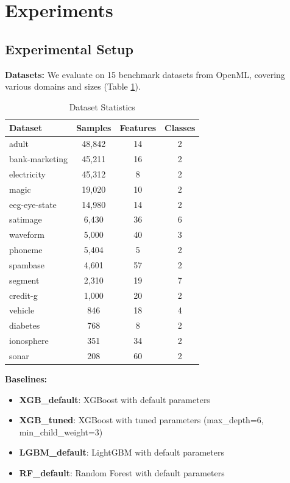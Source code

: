 \documentclass[conference]{IEEEtran}
\begin{document}
\section{Experiments}

\subsection{Experimental Setup}

\textbf{Datasets:} We evaluate on 15 benchmark datasets from OpenML, covering various domains and sizes (Table \ref{tab:datasets}).

\begin{table}[htbp]
\caption{Dataset Statistics}
\label{tab:datasets}
\centering
\begin{tabular}{lccc}
\toprule
Dataset & Samples & Features & Classes \\
\midrule
adult & 48,842 & 14 & 2 \\
bank-marketing & 45,211 & 16 & 2 \\
electricity & 45,312 & 8 & 2 \\
magic & 19,020 & 10 & 2 \\
eeg-eye-state & 14,980 & 14 & 2 \\
satimage & 6,430 & 36 & 6 \\
waveform & 5,000 & 40 & 3 \\
phoneme & 5,404 & 5 & 2 \\
spambase & 4,601 & 57 & 2 \\
segment & 2,310 & 19 & 7 \\
credit-g & 1,000 & 20 & 2 \\
vehicle & 846 & 18 & 4 \\
diabetes & 768 & 8 & 2 \\
ionosphere & 351 & 34 & 2 \\
sonar & 208 & 60 & 2 \\
\bottomrule
\end{tabular}
\end{table}

\textbf{Baselines:}
\begin{itemize}
    \item \textbf{XGB\_default}: XGBoost with default parameters
    \item \textbf{XGB\_tuned}: XGBoost with tuned parameters (max\_depth=6, min\_child\_weight=3)
    \item \textbf{LGBM\_default}:  LightGBM with default parameters
    \item \textbf{RF\_default}: Random Forest with default parameters
\end{itemize}
\end{document}
